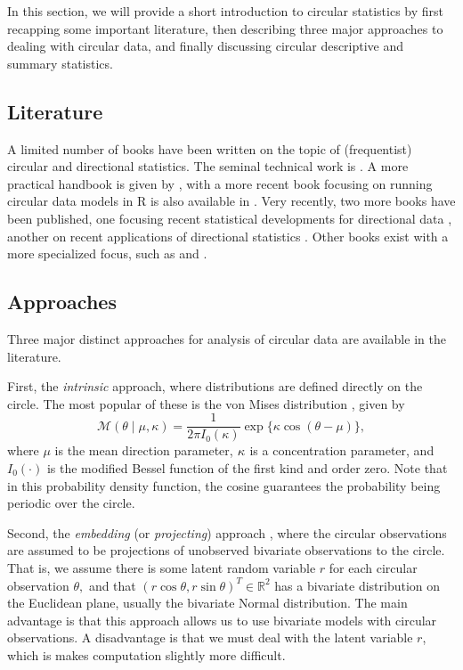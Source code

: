\documentclass[12pt, a4paper]{book}\usepackage[]{graphicx}\usepackage[]{color}
\begin{document}
In this section, we will provide a short introduction to circular statistics by first recapping some important literature, then describing three major approaches to dealing with circular data, and finally discussing circular descriptive and summary statistics.

\subsection{Literature}

A limited number of books have been written on the topic of (frequentist) circular and directional statistics. The seminal technical work is \citet{mardia2009directional}. A more practical handbook is given by \citet{fisher1995statistical}, with a more recent book focusing on running circular data models in R is also available in \citet{pewsey2013circular}. Very recently, two more books have been published, one focusing recent statistical developments for directional data \citep{ley2017modern}, another on recent applications of directional statistics \citep{ley2018applied}. Other books exist with a more specialized focus, such as \citet{batschelet1981circular} and \citet{jammalamadaka2001topics}.

\subsection{Approaches}

Three major distinct approaches for analysis of circular data are available in the literature.

First, the \textit{intrinsic} approach, where distributions are defined directly on the circle. The most popular of these is the von Mises distribution \cite{von1918ganzzahligkeit}, given by
\begin{equation}
\mathcal{M}(\theta \mid \mu, \kappa) = \frac{1}{2 \pi I_0(\kappa)} \exp\{\kappa \cos(\theta - \mu)\},
\end{equation}
where $\mu$ is the mean direction parameter, $\kappa$ is a concentration parameter, and $I_0(\cdot)$ is the modified Bessel function of the first kind and order zero. Note that in this probability density function, the cosine guarantees the probability being periodic over the circle.

Second, the  \textit{embedding} (or \textit{projecting}) approach \citep{presnell1998projected, Nunez-Antonio2005}, where the circular observations are assumed to be projections of unobserved bivariate observations to the circle. That is, we assume there is some latent random variable $r$ for each circular observation $\theta,$ and that $(r \cos\theta, r \sin\theta)^T \in \mathbb{R}^2$  has a bivariate distribution on the Euclidean plane, usually the bivariate Normal distribution. The main advantage is that this approach allows us to use bivariate models with circular observations. A disadvantage is that we must deal with the latent variable $r$, which is makes computation slightly more difficult.
\end{document}
